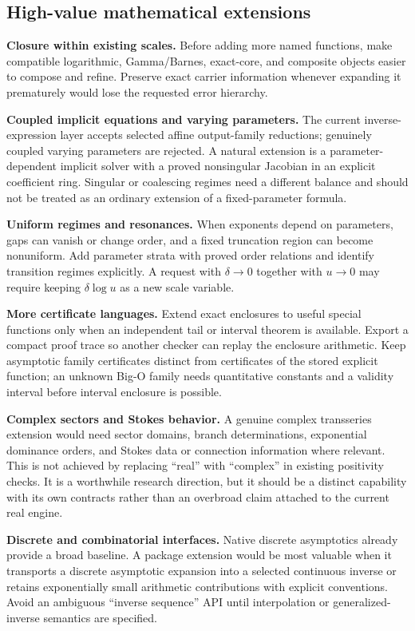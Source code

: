 \subsection{High-value mathematical extensions}
\textbf{Closure within existing scales.} Before adding more named functions, make compatible logarithmic, Gamma/Barnes, exact-core, and composite objects easier to compose and refine. Preserve exact carrier information whenever expanding it prematurely would lose the requested error hierarchy.

\textbf{Coupled implicit equations and varying parameters.} The current inverse-expression layer accepts selected affine output-family reductions; genuinely coupled varying parameters are rejected. A natural extension is a parameter-dependent implicit solver with a proved nonsingular Jacobian in an explicit coefficient ring. Singular or coalescing regimes need a different balance and should not be treated as an ordinary extension of a fixed-parameter formula.\cite{inverseexpressions}

\textbf{Uniform regimes and resonances.} When exponents depend on parameters, gaps can vanish or change order, and a fixed truncation region can become nonuniform. Add parameter strata with proved order relations and identify transition regimes explicitly. A request with $\delta\to0$ together with $u\to0$ may require keeping $\delta\log u$ as a new scale variable.

\textbf{More certificate languages.} Extend exact enclosures to useful special functions only when an independent tail or interval theorem is available. Export a compact proof trace so another checker can replay the enclosure arithmetic. Keep asymptotic family certificates distinct from certificates of the stored explicit function; an unknown Big-O family needs quantitative constants and a validity interval before interval enclosure is possible.

\textbf{Complex sectors and Stokes behavior.} A genuine complex transseries extension would need sector domains, branch determinations, exponential dominance orders, and Stokes data or connection information where relevant. This is not achieved by replacing ``real'' with ``complex'' in existing positivity checks. It is a worthwhile research direction, but it should be a distinct capability with its own contracts rather than an overbroad claim attached to the current real engine.

\textbf{Discrete and combinatorial interfaces.} Native discrete asymptotics already provide a broad baseline. A package extension would be most valuable when it transports a discrete asymptotic expansion into a selected continuous inverse or retains exponentially small arithmetic contributions with explicit conventions. Avoid an ambiguous ``inverse sequence'' API until interpolation or generalized-inverse semantics are specified.\cite{wl-discrete}

